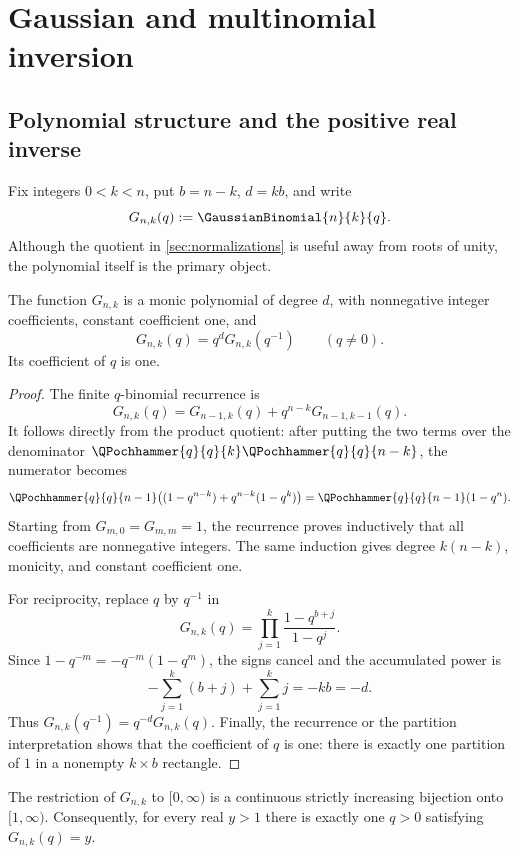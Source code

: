 \chapter{Gaussian and multinomial inversion}
\label{chap:gaussian-multinomial-inversion}

\section{Polynomial structure and the positive real inverse}
\label{sec:gaussian-polynomial}

Fix integers \(0<k<n\), put \(b=n-k\), \(d=kb\), and write
\[
  G_{n,k}(q):=\GaussianBinomial{n}{k}{q}.
\]
Although the quotient in \cref{sec:normalizations} is useful away from roots
of unity, the polynomial itself is the primary object.

\begin{proposition}
\label{prop:gq-positive-palindromic}
The function \(G_{n,k}\) is a monic polynomial of degree \(d\), with
nonnegative integer coefficients, constant coefficient one, and
\[
  G_{n,k}(q)=q^dG_{n,k}(q^{-1})\qquad(q\ne0).
\]
Its coefficient of \(q\) is one.
\end{proposition}

\begin{proof}
The finite \(q\)-binomial recurrence is
\[
  G_{n,k}(q)
  =G_{n-1,k}(q)+q^{n-k}G_{n-1,k-1}(q).
\]
It follows directly from the product quotient: after putting the two terms
over the denominator
\(\QPochhammer{q}{q}{k}\QPochhammer{q}{q}{n-k}\), the numerator becomes
\[
  \QPochhammer{q}{q}{n-1}\bigl((1-q^{n-k})+q^{n-k}(1-q^k)\bigr)
  =\QPochhammer{q}{q}{n-1}(1-q^n).
\]
Starting from \(G_{m,0}=G_{m,m}=1\), the recurrence proves inductively that
all coefficients are nonnegative integers.  The same induction gives degree
\(k(n-k)\), monicity, and constant coefficient one.

For reciprocity, replace \(q\) by \(q^{-1}\) in
\[
  G_{n,k}(q)=\prod_{j=1}^{k}\frac{1-q^{b+j}}{1-q^j}.
\]
Since \(1-q^{-m}=-q^{-m}(1-q^m)\), the signs cancel and the accumulated
power is
\[
  -\sum_{j=1}^{k}(b+j)+\sum_{j=1}^{k}j=-kb=-d.
\]
Thus \(G_{n,k}(q^{-1})=q^{-d}G_{n,k}(q)\).
Finally, the recurrence or the partition interpretation shows that the
coefficient of \(q\) is one: there is exactly one partition of \(1\) in a
nonempty \(k\times b\) rectangle.
\end{proof}

\begin{theorem}
\label{thm:gq-positive-inverse}
The restriction of \(G_{n,k}\) to \([0,\infty)\) is a continuous strictly
increasing bijection onto \([1,\infty)\).  Consequently, for every real
\(y>1\) there is exactly one \(q>0\) satisfying \(G_{n,k}(q)=y\).
\end{theorem}

